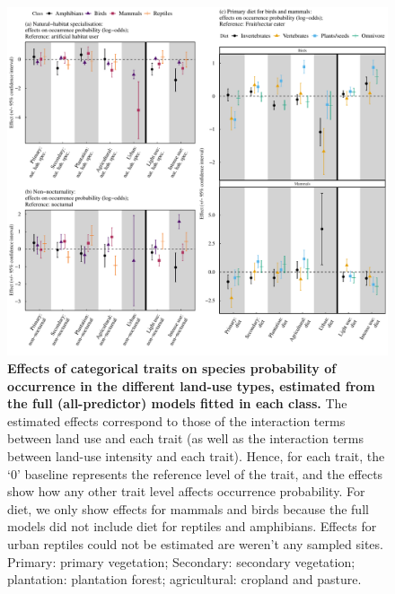 \documentclass[11pt]{article}
\begin{document}
\begin{figure}[h!]
\centering
\includegraphics[scale=0.6]{Figures/Full_LU_models_effects/Land_use_categorical_traits}
\caption[]{\textbf{Effects of categorical traits on species probability of occurrence in the different land-use types, estimated from the full (all-predictor) models fitted in each class.} The estimated effects correspond to those of the interaction terms between land use and each trait (as well as the interaction terms between land-use intensity and each trait). Hence, for each trait, the `0' baseline represents the reference level of the trait, and the effects show how any other trait level affects occurrence probability. For diet, we only show effects for mammals and birds because the full models did not include diet for reptiles and amphibians. Effects for urban reptiles could not be estimated are weren't any sampled sites. Primary: primary vegetation; Secondary: secondary vegetation; plantation: plantation forest; agricultural: cropland and pasture.}
\label{}
\end{figure}
\end{document}
